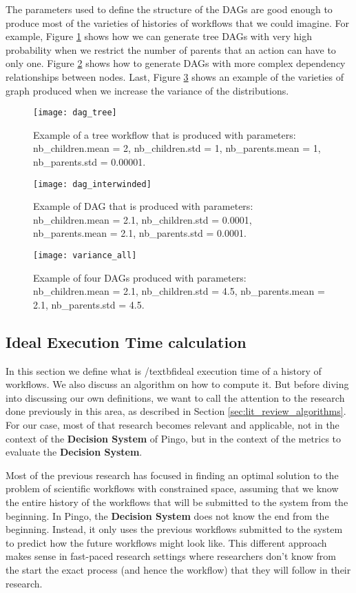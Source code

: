 The parameters used to define the structure of the DAGs are good enough to produce most of the varieties of histories of workflows that we could imagine. For example, Figure \ref{fig:dag_tree} shows how we can generate tree DAGs with very high probability when we restrict the number of parents that an action can have to only one.  Figure \ref{fig:dag_complex} shows how to generate DAGs with more complex dependency relationships between nodes.  Last, Figure \ref{fig:dag_variety} shows an example of the varieties of graph produced when we increase the variance of the distributions.
\begin{figure}
\centering
\texttt{[image: dag\_tree]}
\caption{Example of a tree workflow that is produced with parameters: nb\_children.mean = 2, nb\_children.std =  1, nb\_parents.mean = 1, nb\_parents.std = 0.00001.}
\label{fig:dag_tree}
\end{figure}
\begin{figure}
\centering
\texttt{[image: dag\_interwinded]}
\caption{Example of DAG that is produced with parameters: nb\_children.mean = 2.1, nb\_children.std = 0.0001, nb\_parents.mean = 2.1, nb\_parents.std = 0.0001.}
\label{fig:dag_complex}
\end{figure}

\begin{figure}
\centering
\texttt{[image: variance\_all]}
\caption{Example of four DAGs produced with parameters: nb\_children.mean = 2.1, nb\_children.std = 4.5, nb\_parents.mean = 2.1, nb\_parents.std = 4.5.}
\label{fig:dag_variety}
\end{figure}


\subsection{Ideal Execution Time calculation}
In this section we define what is /textbf{ideal execution time of a history of workflows}. We also discuss an algorithm on how to compute it.  But before diving into discussing our own definitions, we want to call the attention to the research done previously in this area, as described in Section \ref{sec:lit_review_algorithms}.  For our case, most of that research becomes relevant and applicable, not in the context of the \textbf{Decision System} of Pingo, but in the context of the metrics to evaluate the \textbf{Decision System}.  

Most of the previous research has focused in finding an optimal solution to the problem of scientific workflows with constrained space, assuming that we know the entire history of the workflows that will be submitted to the system from the beginning.  In Pingo, the \textbf{Decision System} does not know the end from the beginning.  Instead, it only uses the previous workflows submitted to the system to predict how the future workflows might look like.  This different approach makes sense in fast-paced research settings where researchers don't know from the start the exact process (and hence the workflow) that they will follow in their research.

